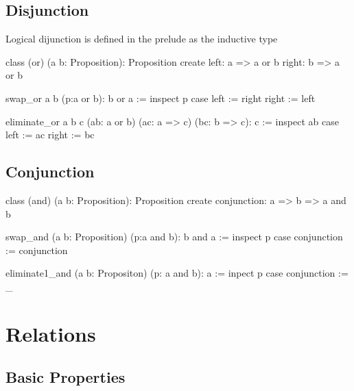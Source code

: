 \subsection{Disjunction}

Logical dijunction is defined in the prelude as the inductive type
%
\begin{alba}
  class
    (or) (a b: Proposition): Proposition
  create
    left:  a => a or b
    right: b => a or b
\end{alba}


\begin{alba}
  swap_or a b (p:a or b): b or a :=
    inspect
      p
    case
      left  := right
      right := left
\end{alba}

\begin{alba}
  eliminate_or a b c (ab: a or b) (ac: a => c) (bc: b => c): c :=
    inspect
      ab
    case
      left :=
        ac
      right :=
        bc
\end{alba}


\subsection{Conjunction}

\begin{alba}
  class
    (and) (a b: Proposition): Proposition
  create
    conjunction: a => b => a and b
\end{alba}


\begin{alba}
  swap_and (a b: Proposition) (p:a and b): b and a :=
    inspect
      p
    case
      conjunction := conjunction
\end{alba}


\begin{alba}
  eliminate1_and (a b: Propositon) (p: a and b): a :=
    inpect p case
      conjunction := _
\end{alba}







\newpage
\section{Relations}
\label{sec:certprog-relations}


\subsection{Basic Properties}


